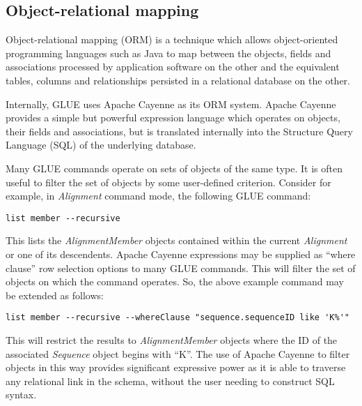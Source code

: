 \subsection*{Object-relational mapping}

Object-relational mapping (ORM) is a technique which allows object-oriented
programming languages such as Java to map between the objects, fields and
associations processed by application software on the other and the equivalent
tables, columns and relationships persisted in a relational database on the
other.

Internally, GLUE uses Apache Cayenne \cite{ApacheCayenne_2017} as its ORM
system. Apache Cayenne provides a simple but powerful expression language which
operates on objects, their fields and associations, but is translated internally
into the Structure Query Language (SQL) of the underlying database.

Many GLUE commands operate on sets of objects of the same type.
It is often useful to filter the set of objects by some user-defined criterion.
Consider for example, in \emph{Alignment} command mode, the following GLUE
command:

\begin{verbatim}
list member --recursive
\end{verbatim}

This lists the \emph{AlignmentMember} objects contained within the current
\emph{Alignment} or one of its descendents. Apache Cayenne expressions may be
supplied as ``where clause'' row selection options to many GLUE commands. This
will filter the set of objects on which the command operates. So, the above
example command may be extended as follows:

\begin{verbatim}
list member --recursive --whereClause "sequence.sequenceID like 'K%'"
\end{verbatim}

This will restrict the results to \emph{AlignmentMember} objects where the ID of
the associated \emph{Sequence} object begins with ``K''. The use of Apache Cayenne
to filter objects in this way provides significant expressive power as it is
able to traverse any relational link in the schema, without the user needing to
construct SQL syntax.